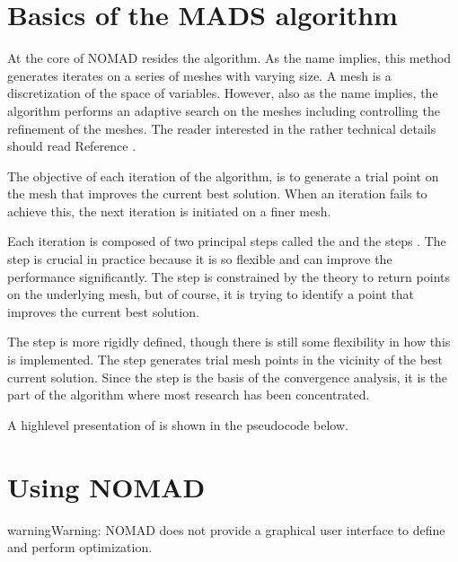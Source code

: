 \documentclass[letterpaper,10pt,english]{sphinxmanual}
\begin{document}
\section{Basics of the MADS algorithm}
\label{\detokenize{Introduction:basics-of-the-mads-algorithm}}
\sphinxAtStartPar
At the core of NOMAD resides the  algorithm.
As the name implies, this method generates iterates on a series of meshes with varying size.
A mesh is a discretization of the space of variables.
However, also as the name implies, the algorithm performs an adaptive search on the meshes including controlling the refinement of the meshes.
The reader interested in the rather technical details should read Reference .

\sphinxAtStartPar
The objective of each iteration of the  algorithm, is to generate a trial point on the mesh that improves the current best solution.
When an iteration fails to achieve this, the next iteration is initiated on a finer mesh.

\sphinxAtStartPar
Each iteration is composed of two principal steps called the  and the  steps .
The  step is crucial in practice because it is so flexible and can improve the performance significantly.
The  step is constrained by the theory to return points on the underlying mesh, but of course,
it is trying to identify a point that improves the current best solution.

\sphinxAtStartPar
The  step is more rigidly defined, though there is still some flexibility in how this is implemented.
The  step generates trial mesh points in the vicinity of the best current solution.
Since the  step is the basis of the convergence analysis, it is the part of the algorithm where most research has been concentrated.

\sphinxAtStartPar
A high\sphinxhyphen{}level presentation of  is shown in the pseudo\sphinxhyphen{}code below.

\begin{figure}[htbp]
\centering

\noindent{}
\end{figure}


\section{Using NOMAD}
\label{\detokenize{Introduction:using-nomad}}
\begin{sphinxadmonition}{warning}{Warning:}
\sphinxAtStartPar
NOMAD does not provide a graphical user interface to define and perform optimization.
\end{sphinxadmonition}
\end{document}
